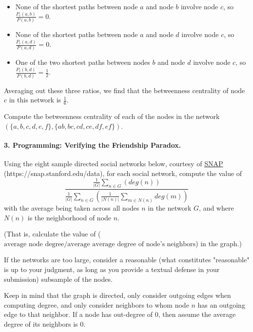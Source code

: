 \documentclass[11pt]{article}
\theoremstyle{definition} \newtheorem{Theorem}{theorem}
\begin{document}
\begin{itemize}
 \item None of the shortest paths between node $a$ and node $b$ involve node $c$, so $\frac{P_c(a,b)}{P(a,b)}=0$.
  \item None of the shortest paths between node $a$ and node $d$ involve node $c$, so $\frac{P_c(a,d)}{P(a,d)}=0$.  
 \item One of the two shortest paths between nodes $b$ and node $d$ involve node $c$, so $\frac{P_c(b,d)}{P(b,d)}=\frac{1}{2}$.
\end{itemize}


Averaging out these three ratios, we find that the betweenness centrality of node $c$ in this network is $\frac{1}{6}$.
 
Compute the betweenness centrality of each of the nodes in the network $(\{a,b,c,d,e,f\}, \{ab,bc,cd,ce,df,ef\})$. 


\paragraph{3. Programming: Verifying the Friendship Paradox.}  Using the eight sample directed social networks below, courtesy of \href{https://snap.stanford.edu/data}{SNAP} (https://snap.stanford.edu/data), for each social network, compute the value of
$$\frac{\frac{1}{|G|}\sum\limits_{n \in G}(deg(n))}{\frac{1}{|G|}\sum\limits_{n\in G}(\frac{1}{|N(n)|}\sum\limits_{m \in N(n)} deg(m))}$$
with the average being taken across all nodes $n$ in the network $G$, and where $N(n)$ is the neighborhood of node $n$.

(That is, calculate the value of ($\text{average node degree}/\text{average average degree of node's neighbors}$) in the graph.)

If the networks are too large, consider a reasonable (what constitutes "reasonable" is up to your judgment, as long as you provide a textual defense in your submission) subsample of the nodes.

Keep in mind that the graph is directed, only consider outgoing edges when computing degree, and only consider neighbors to whom node $n$ has an outgoing edge to that neighbor. If a node has out-degree of $0$, then assume the average degree of its neighbors is $0$. \\
\end{document}
